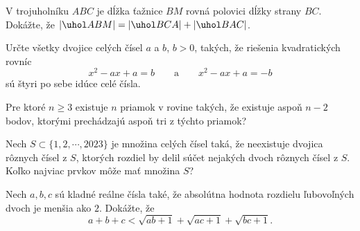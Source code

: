 {%
V trojuholníku $ABC$ je dĺžka ťažnice $BM$ rovná polovici dĺžky strany $BC$. Dokážte, že $|\uhol ABM| = |\uhol BCA| + |\uhol BAC|$.}

{%
Určte všetky dvojice celých čísel $a$ a $b$, $b > 0$, takých, že riešenia kvadratických rovníc
$$x^2 -ax + a = b \qquad \text{a} \qquad x^2 - ax + a = -b$$ sú štyri po sebe idúce celé čísla.}

{%
Pre ktoré $n \geq 3$ existuje $n$ priamok v rovine takých, že existuje aspoň $n-2$ bodov, ktorými prechádzajú aspoň tri z týchto priamok?}

{%
Nech $S\subset\{1,2,\cdots,2023\}$ je množina celých čísel taká, že neexistuje dvojica rôznych čísel z $S$, ktorých rozdiel by delil súčet nejakých dvoch rôznych čísel z $S$. Koľko najviac prvkov môže mať množina $S$?}

{%
Nech $ a,b,c$ sú kladné reálne čísla také, že absolútna hodnota rozdielu ľubovoľných dvoch je menšia ako $ 2$. Dokážte, že $$ a + b + c < \sqrt {ab + 1} + \sqrt {ac + 1} + \sqrt {bc + 1}.$$}
